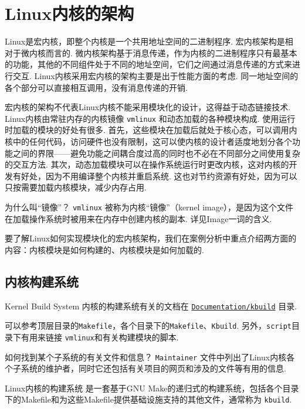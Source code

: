 \section{Linux内核的架构}
Linux是宏内核，即整个内核是一个共用地址空间的二进制程序.
宏内核架构是相对于微内核而言的.
微内核架构基于消息传递，作为内核的二进制程序只有最基本的功能，其他的不同组件处于不同的地址空间，它们之间通过消息传递的方式来进行交互.
Linux内核采用宏内核的架构主要是出于性能方面的考虑.\cite{silberschatz2021operating}
同一地址空间的各个部分可以直接相互调用，没有消息传递的开销.

宏内核的架构不代表Linux内核不能采用模块化的设计，这得益于动态链接技术.
Linux内核由常驻内存的内核镜像 \lstinline{vmlinux}%
和动态加载的各种模块构成.
使用运行时加载的模块的好处有很多.
首先，这些模块在加载后就处于核心态，可以调用内核中的任何代码，访问硬件也没有限制，这可以使内核的设计者适度地划分各个功能之间的界限——避免功能之间耦合度过高的同时也不必在不同部分之间使用复杂的交互方法.
其次，动态加载模块可以在操作系统运行时更改内核，这对内核的开发有好处，因为不用编译整个内核并重启系统.
这也对节约资源有好处，因为可以只按需要加载内核模块，减少内存占用.

\begin{qbox}{为什么叫“镜像”？}
	\lstinline{vmlinux} 被称为内核“镜像”（kernel image），是因为这个文件在加载操作系统时被用来在内存中创建内核的副本.
	详见Image一词的含义\cite{imageWik70:online}.
\end{qbox}

要了解Linux如何实现模块化的宏内核架构，我们在案例分析中重点介绍两方面的内容：内核模块是如何构建的、内核模块是如何加载的.

\subsection{内核构建系统} \label{kbuild}
\begin{readsrcbox}{Kernel Build System}
	内核的构建系统有关的文档在 \href{https://docs.kernel.org/kbuild/index.html}{\lstinline{Documentation/kbuild}} 目录.

	可以参考顶层目录的\lstinline{Makefile}，各个目录下的\lstinline{Makefile}、\lstinline{Kbuild}.
	另外，\lstinline{script}目录下有用来链接 \lstinline{vmlinux}和有关构建模块的脚本.
\end{readsrcbox}
\begin{qbox}{如何找到某个子系统的有关文件和信息？}
	\lstinline{Maintainer} 文件中列出了Linux内核各个子系统的维护者，同时它还包括有关项目的网页和涉及的文件等有用的信息.
\end{qbox}
Linux内核的构建系统%
是一套基于GNU Make的递归式的构建系统，包括各个目录下的Makefile和为这些Makefile提供基础设施支持的其他文件，通常称为 \lstinline{kbuild}. \cite{LinuxKer71:online}

